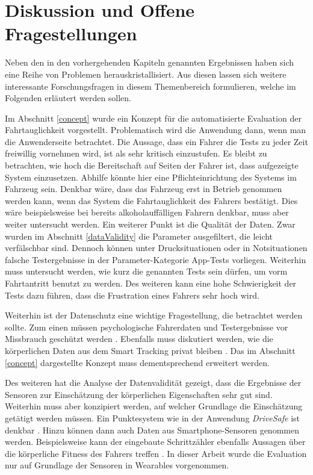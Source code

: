 \section{Diskussion und Offene Fragestellungen}
\label{openChallenges}

Neben den in den vorhergehenden Kapiteln genannten Ergebnissen haben sich eine Reihe von Problemen herauskristallisiert. Aus diesen lassen sich weitere interessante Forschungsfragen in diesem Themenbereich formulieren, welche im Folgenden erläutert werden sollen.

Im Abschnitt \ref{concept} wurde ein Konzept für die automatisierte Evaluation der Fahrtauglichkeit vorgestellt. Problematisch wird die Anwendung dann, wenn man die Anwenderseite betrachtet. Die Aussage, dass ein Fahrer die Tests zu jeder Zeit freiwillig vornehmen wird, ist als sehr kritisch einzustufen. Es bleibt zu betrachten, wie hoch die Bereitschaft auf Seiten der Fahrer ist, dass aufgezeigte System einzusetzen. Abhilfe könnte hier eine Pflichteinrichtung des Systems im Fahrzeug sein. Denkbar wäre, dass das Fahrzeug erst in Betrieb genommen werden kann, wenn das System die Fahrtauglichkeit des Fahrers bestätigt. Dies wäre beispielsweise bei bereits alkoholauffälligen Fahrern denkbar, muss aber weiter untersucht werden. Ein weiterer Punkt ist die Qualität der Daten. Zwar wurden im Abschnitt \ref{dataValidity} die Parameter ausgefiltert, die leicht verfälschbar sind. Dennoch können unter Drucksituationen oder in Notsituationen falsche Testergebnisse in der Parameter-Kategorie App-Tests vorliegen. Weiterhin muss untersucht werden, wie kurz die genannten Tests sein dürfen, um vorm Fahrtantritt benutzt zu werden. Des weiteren kann eine hohe Schwierigkeit der Tests dazu führen, dass die Frustration eines Fahrers sehr hoch wird. 

Weiterhin ist der Datenschutz eine wichtige Fragestellung, die betrachtet werden sollte. Zum einen müssen psychologische Fahrerdaten und Testergebnisse vor Missbrauch geschützt werden \cite{beurteilungskriterienleipzig}. Ebenfalls muss diskutiert werden, wie die körperlichen Daten aus dem Smart Tracking privat bleiben \cite{securityprivacyfitnesstracking}. Das im Abschnitt \ref{concept} dargestellte Konzept muss dementsprechend erweitert werden.

Des weiteren hat die Analyse der Datenvalidität gezeigt, dass die Ergebnisse der Sensoren zur Einschätzung der körperlichen Eigenschaften sehr gut sind. Weiterhin muss aber konzipiert werden, auf welcher Grundlage die Einschätzung getätigt werden müssen. Ein Punktesystem wie in der Anwendung \textit{DriveSafe} ist denkbar \cite{drivesafe}. Hinzu können dann auch Daten aus Smartphone-Sensoren genommen werden. Beispielsweise kann der eingebaute Schrittzähler ebenfalls Aussagen über die körperliche Fitness des Fahrers treffen \cite{validationphysicalactivitytracking,bewegungserkennungsensoren}. In dieser Arbeit wurde die Evaluation nur auf Grundlage der Sensoren in Wearables vorgenommen.

